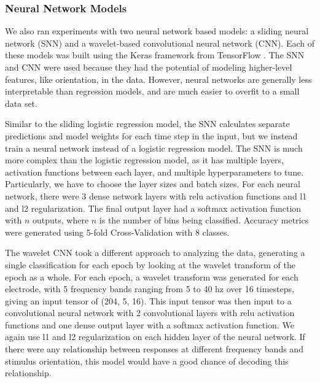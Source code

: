 \documentclass[../main.tex]{subfiles}
\begin{document}
\subsubsection{Neural Network Models}
We also ran experiments with two neural network based models: a sliding neural network (SNN) and a wavelet-based convolutional neural network (CNN). Each of these models was built using the Keras framework from TensorFlow \citep{chollet2015keras, tensorflow2015-whitepaper}. The SNN and CNN were used because they had the potential of modeling higher-level features, like orientation, in the data. However, neural networks are generally less interpretable than regression models, and are much easier to overfit to a small data set. 

Similar to the sliding logistic regression model, the SNN calculates separate predictions and model weights for each time step in the input, but we instead train a neural network instead of a logistic regression model. The SNN is much more complex than the logistic regression model, as it has multiple layers, activation functions between each layer, and multiple hyperparameters to tune. Particularly, we have to choose the layer sizes and batch sizes. For each neural network, there were 3 dense network layers with relu activation functions and l1 and l2 regularization. The final output layer had a softmax activation function with $n$ outputs, where $n$ is the number of bins being classified. Accuracy metrics were generated using 5-fold Cross-Validation with 8 classes.

The wavelet CNN took a different approach to analyzing the data, generating a single classification for each epoch by looking at the wavelet transform of the epoch as a whole. For each epoch, a wavelet transform was generated for each electrode, with 5 frequency bands ranging from 5 to 40 hz over 16 timesteps, giving an input tensor of (204, 5, 16). This input tensor was then input to a convolutional neural network with 2 convolutional layers with relu activation functions and one dense output layer with a softmax activation function. We again use l1 and l2 regularization on each hidden layer of the neural network. If there were any relationship between responses at different frequency bands and stimulus orientation, this model would have a good chance of decoding this relationship.
\end{document}

